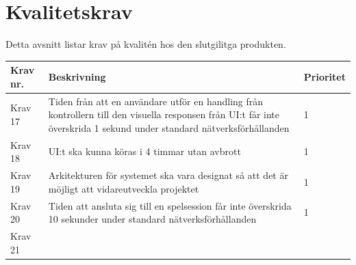 \documentclass[10pt]{article}
\begin{document}
\section{Kvalitetskrav}
	Detta avsnitt listar krav på kvalitén hos den slutgilitga produkten.
	
		\begin{tabular}{|p{2cm}|p{8cm}|p{2cm}|}
		\hline
		\textbf{Krav nr.} & \textbf{Beskrivning} & \textbf{Prioritet} \\ \hline
		Krav 17 & Tiden från att en användare utför en handling från kontrollern till den visuella responsen från UI:t får inte överskrida 1 sekund under standard nätverksförhållanden & 1\\ \hline
		Krav 18 & UI:t ska kunna köras i 4 timmar utan avbrott & 1 \\ \hline
		Krav 19 & Arkitekturen för systemet ska vara designat så att det är möjligt att vidareutveckla projektet & 1 \\ \hline
		Krav 20 & Tiden att ansluta sig till en spelsession får inte överskrida 10 sekunder under standard nätverksförhållanden & 1 \\ \hline
		Krav 21 & 
		
	\end{tabular}
\end{document}
